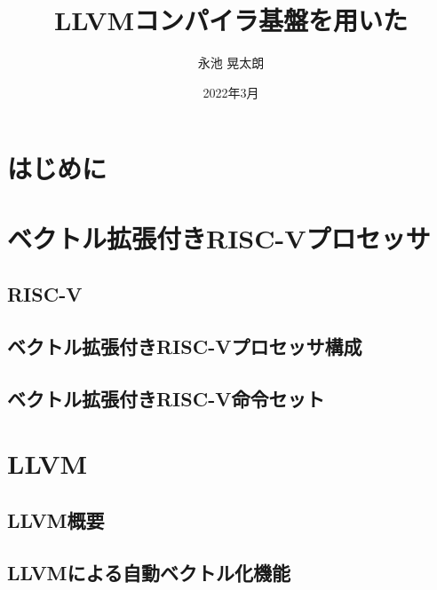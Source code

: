 \documentclass[a4paper,11pt,fleqn]{jbook}
\title{LLVMコンパイラ基盤を用いた}
\author{永池 晃太朗}
\date{2022年3月}
\begin{document}
\maketitle

\begin{jabstract}

\end{jabstract}

\begin{abstract}
\end{abstract}

\newpage
\tableofcontents    %


\newpage
\chapter{はじめに}
\label{chp:intro}   %



\newpage
\chapter{ベクトル拡張付きRISC-Vプロセッサ}
\label{chp:2}


\section{RISC-V}
\label{chp:2_1}

\section{ベクトル拡張付きRISC-Vプロセッサ構成}
\label{chp:2_2}

\section{ベクトル拡張付きRISC-V命令セット}
\label{chp:2_3}



\newpage
\chapter{LLVM}
\label{chp:3}

\section{LLVM概要}
\label{chp:3_1}

\section{LLVMによる自動ベクトル化機能}
\label{chp:3_2}

\end{document}
